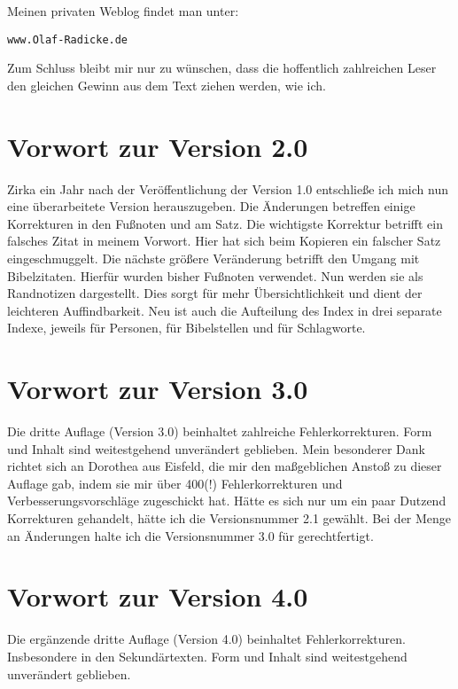 Meinen privaten Weblog findet man unter:

\begin{center}
\texttt{www.Olaf-Radicke.de}
\end{center}

Zum Schluss bleibt mir nur zu wünschen, dass die hoffentlich zahlreichen Leser
den gleichen Gewinn aus dem Text ziehen werden, wie ich.


\chapter{Vorwort zur Version 2.0}

Zirka ein Jahr nach der Veröffentlichung der Version 1.0 entschließe ich mich 
nun eine überarbeitete Version herauszugeben. Die Änderungen betreffen einige
Korrekturen in den Fußnoten und am Satz. Die wichtigste Korrektur betrifft ein 
falsches Zitat in meinem Vorwort. Hier hat sich beim Kopieren ein falscher Satz 
eingeschmuggelt. Die nächste größere Veränderung betrifft den Umgang mit
Bibelzitaten. Hierfür wurden bisher Fußnoten verwendet. Nun werden sie als
Randnotizen dargestellt. Dies sorgt für mehr Übersichtlichkeit 
und dient der leichteren Auffindbarkeit. Neu ist auch die Aufteilung des Index in 
drei separate Indexe, jeweils für Personen, für Bibelstellen und für Schlagworte.


\chapter{Vorwort zur Version 3.0}

Die dritte Auflage (Version 3.0) beinhaltet zahlreiche Fehlerkorrekturen.
Form und Inhalt sind weitestgehend unverändert geblieben. Mein besonderer Dank 
richtet sich an Dorothea aus Eisfeld, die mir den maßgeblichen Anstoß zu dieser 
Auflage gab, indem sie mir über 400(!) Fehlerkorrekturen und Verbesserungsvorschläge 
zugeschickt hat. Hätte es sich nur um ein paar Dutzend Korrekturen gehandelt,
hätte ich die Versionsnummer 2.1 gewählt. Bei der Menge an Änderungen halte
ich die Versionsnummer 3.0 für gerechtfertigt.


\chapter{Vorwort zur Version 4.0}

Die ergänzende dritte Auflage (Version 4.0) beinhaltet Fehlerkorrekturen. 
Insbesondere in den Sekundärtexten. Form und Inhalt sind weitestgehend unverändert 
geblieben.
